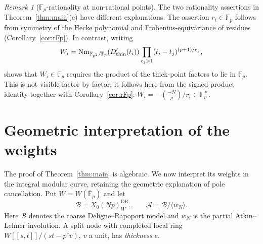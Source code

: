 \documentclass[11pt,a4paper]{article}
\numberwithin{equation}{section}
\theoremstyle{definition}
\theoremstyle{remark}
\newtheorem{remark}[theorem]{Remark}
\newcommand{\Fp}{\mathbb F_p}
\newcommand{\Fq}{\mathbb F_{p^2}}
\newcommand{\Fb}{\overline{\mathbb F}_p}
\newcommand{\Lp}[1]{\left(\frac{#1}{p}\right)}
\begin{document}
\begin{remark}[$\Fp$-rationality at non-rational points]
The two rationality assertions in Theorem~\ref{thm:main}(e) have different
explanations. The assertion $r_i\in\Fp$ follows from symmetry of the
Hecke polynomial and Frobenius-equivariance of residues
(Corollary~\ref{cor:rFp}). In contrast, writing
\[
W_i=\operatorname{Nm}_{\Fq/\Fp}(D_{\rm thin}'(t_i))
\prod_{e_j>1}(t_i-t_j)^{(p+1)/e_j},
\]
shows that $W_i\in\Fp$ requires the product of the thick-point factors
to lie in $\Fp$. This is not visible factor by factor; it follows here
from the signed product identity together with Corollary~\ref{cor:rFp}:
$W_i=-\Lp{-N}/r_i\in\Fp^\times$.
\end{remark}


\section{Geometric interpretation of the weights}\label{sec:geometry}
The proof of Theorem~\ref{thm:main} is algebraic. We now interpret its weights in
the integral modular curve, retaining the geometric explanation of pole cancellation.
Put $W=W(\Fb)$ and let
\[
\mathcal B=X_0(Np)^{\mathrm{DR}}_W,\qquad
\mathcal A=\mathcal B/\langle w_N\rangle.
\]
Here $\mathcal B$ denotes the coarse Deligne--Rapoport model and $w_N$ is the
partial Atkin--Lehner involution. A split node with completed local ring
$W[[s,t]]/(st-p^ev)$, $v$ a unit, has \emph{thickness} $e$.
\end{document}

